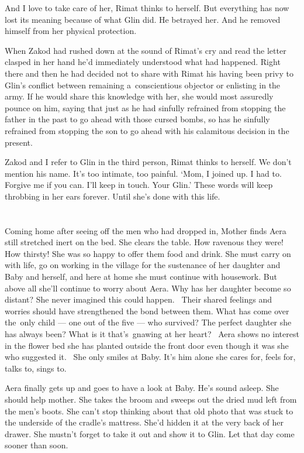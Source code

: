 \documentclass[twoside,11pt,openany]{book}
\begin{document}
And I love to take care of her, Rimat thinks to herself. But everything has now lost its meaning because of what Glin
did. He betrayed her. And he removed himself from her physical protection.

When Zakod had rushed down at the sound of Rimat's cry and read the letter clasped in her hand
he{'}d immediately understood what had happened. Right there and then he had decided not to share with
Rimat his having been privy to Glin's conflict between remaining a~conscientious objector or enlisting in the
army. If he would share this knowledge with her, she would most assuredly pounce on him, saying that just as he had
sinfully refrained from stopping the father in the past to go ahead with those cursed bombs, so has he
sinfully refrained from stopping the son to go ahead with his calamitous decision  in the present.

Zakod and I refer to Glin in the third person, Rimat thinks to herself. We don't mention his name. It's
too intimate, too painful. `Mom, I joined up. I had to. Forgive me if you can. I'll keep in touch. Your
Glin.' These words will keep throbbing in her ears forever. Until she's done with this life.


\chapter{}

Coming home after seeing off the men who had dropped in, Mother finds Aera still stretched inert on the bed. She clears
the table. How ravenous they were! How thirsty! She was so happy to offer them food and drink. She must carry on with
life, go on working in the village for the sustenance of her daughter and Baby\textbf{ }and herself, and here at home
she must continue with housework.{ }But above all she'll continue to worry about Aera. Why has her
daughter become so distant? She never imagined this could happen. ~Their shared feelings and worries should have
strengthened the bond between them. What has come over the~only child --- one out of the five --- who survived? The perfect
daughter she has always been? What is it that's~gnawing at her heart? ~Aera shows no interest in the flower bed she has
planted outside the front door even though it was she who suggested it. ~She only smiles at Baby. It's him alone she
cares for, feels for, talks to, sings to.

Aera finally gets up and goes to have a look at Baby. He's sound asleep. She should help mother. She takes the broom and
sweeps out the dried mud left from the men's boots. She can't stop thinking about that old photo that was stuck
to{ }the underside of the cradle's mattress. She'd hidden it at the very back of her drawer. She
mustn't forget to take it out and show it to Glin. Let that day come sooner than soon.
\end{document}
